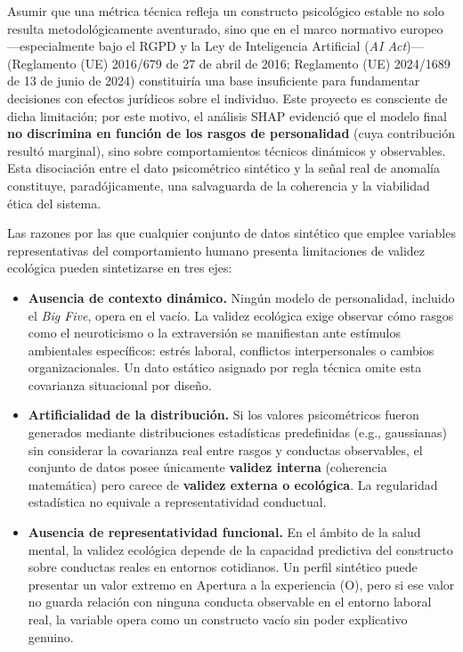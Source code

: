 \documentclass[IB]{TFUOC}%
\begin{document}
\medskip
\noindent Asumir que una métrica técnica refleja un constructo psicológico estable no solo resulta metodológicamente aventurado, sino que en el marco normativo europeo —especialmente bajo el RGPD y la Ley de Inteligencia Artificial (\textit{AI Act})— (Reglamento (UE) 2016/679 de 27 de abril de 2016; Reglamento (UE) 2024/1689 de 13 de junio de 2024) constituiría una base insuficiente para fundamentar decisiones con efectos jurídicos sobre el individuo. Este proyecto es consciente de dicha limitación; por este motivo, el análisis SHAP evidenció que el modelo final \textbf{no discrimina en función de los rasgos de personalidad} (cuya contribución resultó marginal), sino sobre comportamientos técnicos dinámicos y observables. Esta disociación entre el dato psicométrico sintético y la señal real de anomalía constituye, paradójicamente, una salvaguarda de la coherencia y la viabilidad ética del sistema.

\medskip
\noindent Las razones por las que cualquier conjunto de datos sintético que emplee variables representativas del comportamiento humano presenta limitaciones de validez ecológica pueden sintetizarse en tres ejes:

\begin{itemize}
    \item \textbf{Ausencia de contexto dinámico.} 
    Ningún modelo de personalidad, incluido el \textit{Big Five}, opera en el vacío. La validez ecológica exige observar cómo rasgos como el neuroticismo o la extraversión se manifiestan ante estímulos ambientales específicos: estrés laboral, conflictos interpersonales o cambios organizacionales. Un dato estático asignado por regla técnica omite esta covarianza situacional por diseño.

    \item \textbf{Artificialidad de la distribución.} 
    Si los valores psicométricos fueron generados mediante distribuciones estadísticas predefinidas (e.g., gaussianas) sin considerar la covarianza real entre rasgos y conductas observables, el conjunto de datos posee únicamente \textbf{validez interna} (coherencia matemática) pero carece de \textbf{validez externa o ecológica}. La regularidad estadística no equivale a representatividad conductual.

    \item \textbf{Ausencia de representatividad funcional.} 
    En el ámbito de la salud mental, la validez ecológica depende de la capacidad predictiva del constructo sobre conductas reales en entornos cotidianos. Un perfil sintético puede presentar un valor extremo en Apertura a la experiencia (O), pero si ese valor no guarda relación con ninguna conducta observable en el entorno laboral real, la variable opera como un constructo vacío sin poder explicativo genuino.
\end{itemize}
\end{document}
